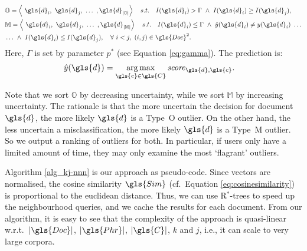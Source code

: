 \begin{align*}
    &\mathbb{O} = \left \langle ~\gls{d}_i,~\gls{d}_j,~\dots~, \gls{d}_{|\mathbb{O}|}\right \rangle  \quad s.t. \quad I(\gls{d}_i) > \Gamma ~\wedge~  I(\gls{d}_i) \geq I(\gls{d}_j), \\
    &\mathbb{M} = \left \langle ~\gls{d}_i,~\gls{d}_j,~\dots~, \gls{d}_{|\mathbb{M}|}\right \rangle  \quad s.t. \quad I(\gls{d}_i) \leq \Gamma ~\wedge~   \hat{y}(\gls{d}_i) \neq y(\gls{d}_i)~\dots \\ 
    & \dots ~\wedge~  I(\gls{d}_i) \leq I(\gls{d}_j), \quad \forall~i < j,~(i,j) \in \gls{Doc}^2.
\end{align*}
Here, $\Gamma$ is set by parameter $p^*$ (see Equation \ref{eq:gamma}). The prediction is: 
\begin{align}
     \hat{y}(\gls{d}) &= \argmax_{\gls{c} \in \gls{C}} \mathit{score}_{\gls{d},\gls{c}}.
\end{align}

Note that we sort $\mathbb{O}$ by decreasing uncertainty, while we sort $\mathbb{M}$ by increasing uncertainty. The rationale is that the more uncertain the decision for document $\gls{d}$, the more likely $\gls{d}$ is a Type~O outlier. 
On the other hand, the less uncertain a misclassification, the more likely $\gls{d}$ is a Type~M outlier. 
So we output a ranking of outliers for both. In particular, if users only have a limited amount of time, they may only examine the most `flagrant' outliers. 

Algorithm \ref{alg_kj-nnn} is our approach as pseudo-code. Since vectors are normalised, the cosine similarity $\gls{Sim}$ (cf.\ Equation \ref{eq:cosinesimilarity}) is proportional to the euclidean distance. Thus, we can use R$^*$-trees to speed up the neighbourhood queries, and we cache the results for each document. From our algorithm, it is easy to see that the complexity of the approach is quasi-linear w.r.t.\ $|\gls{Doc}|$, $|\gls{Phr}|$, $|\gls{C}|$, $k$ and $j$, i.e., it can scale to very large corpora. 

